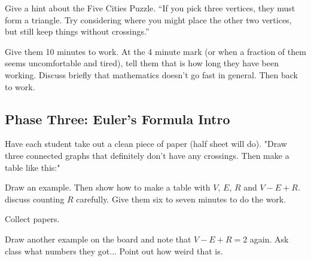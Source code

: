 \documentclass[12pt]{amsart}
\theoremstyle{definition}
\begin{document}
Give a hint about the Five Cities Puzzle. ``If you pick three vertices, they must form a triangle. Try considering where you might place the other two vertices, but still keep things without crossings.''

Give them 10 minutes to work. At the 4 minute mark (or when a fraction of them seems uncomfortable and tired), 
tell them that is how long they have been working. Discuss briefly that mathematics doesn't go fast in general. Then back to work.

\subsection*{Phase Three: Euler's Formula Intro}

Have each student take out a clean piece of paper (half sheet will do). "Draw three connected graphs that definitely don't have any crossings. Then make a table like this:"

Draw an example. Then show how to make a table with $V$, $E$, $R$ and $V-E+R$. discuss counting $R$ carefully.
Give them six to seven minutes to do the work.

Collect papers.

Draw another example on the board and note that $V-E+R=2$ again. Ask class what numbers they got... Point out how weird that is.
\end{document}
